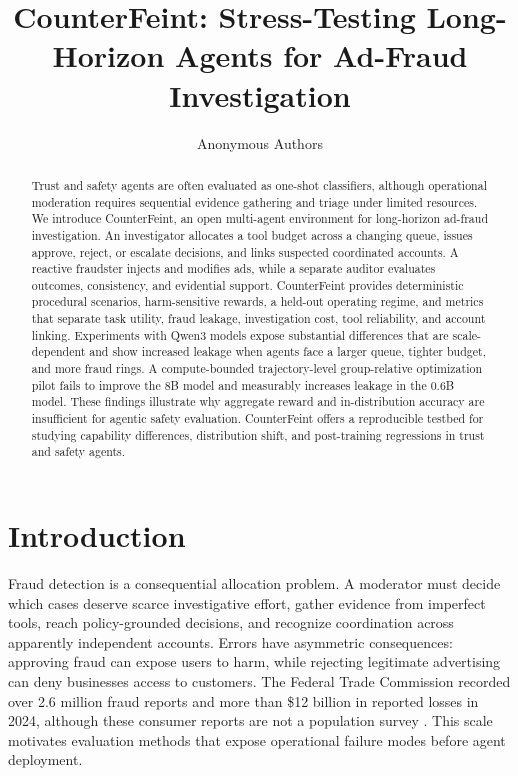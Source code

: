 \documentclass{article}
\title{CounterFeint: Stress-Testing Long-Horizon Agents for Ad-Fraud Investigation}
\author{Anonymous Authors}
\begin{document}
\nolinenumbers
\maketitle

\begin{abstract}
Trust and safety agents are often evaluated as one-shot classifiers, although operational moderation requires sequential evidence gathering and triage under limited resources. We introduce CounterFeint, an open multi-agent environment for long-horizon ad-fraud investigation. An investigator allocates a tool budget across a changing queue, issues approve, reject, or escalate decisions, and links suspected coordinated accounts. A reactive fraudster injects and modifies ads, while a separate auditor evaluates outcomes, consistency, and evidential support. CounterFeint provides deterministic procedural scenarios, harm-sensitive rewards, a held-out operating regime, and metrics that separate task utility, fraud leakage, investigation cost, tool reliability, and account linking. Experiments with Qwen3 models expose substantial differences that are scale-dependent and show increased leakage when agents face a larger queue, tighter budget, and more fraud rings. A compute-bounded trajectory-level group-relative optimization pilot fails to improve the 8B model and measurably increases leakage in the 0.6B model. These findings illustrate why aggregate reward and in-distribution accuracy are insufficient for agentic safety evaluation. CounterFeint offers a reproducible testbed for studying capability differences, distribution shift, and post-training regressions in trust and safety agents.
\end{abstract}

\section{Introduction}

Fraud detection is a consequential allocation problem. A moderator must decide which cases deserve scarce investigative effort, gather evidence from imperfect tools, reach policy-grounded decisions, and recognize coordination across apparently independent accounts. Errors have asymmetric consequences: approving fraud can expose users to harm, while rejecting legitimate advertising can deny businesses access to customers. The Federal Trade Commission recorded over 2.6 million fraud reports and more than \$12 billion in reported losses in 2024, although these consumer reports are not a population survey \citep{ftc2025sentinel}. This scale motivates evaluation methods that expose operational failure modes before agent deployment.
\end{document}
